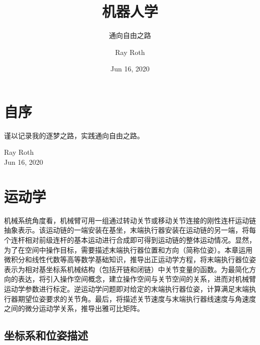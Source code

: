 \documentclass[cn,11pt,chinese,blue,bibstyle=ieeetr]{elegantbook}
\title{机器人学}
\subtitle{通向自由之路}
\author{Ray Roth}
\institute{Enabot}
\date{Jun 16, 2020}
\begin{document}
\maketitle
\frontmatter

\chapter*{自序}
谨以记录我的逐梦之路，实践通向自由之路。

\vskip 1.5cm

\begin{flushright}
Ray Roth\\
Jun 16, 2020
\end{flushright}

\tableofcontents

\mainmatter


\chapter{运动学}

机械系统角度看，机械臂可用一组通过转动关节或移动关节连接的刚性连杆运动链抽象表示。该运动链的一端安装在基坐，末端执行器安装在运动链的另一端，将每个连杆相对前级连杆的基本运动进行合成即可得到运动链的整体运动情况。显然，为了在空间中操作目标，需要描述末端执行器位置和方向（简称位姿）。本章运用微积分和线性代数等高等数学基础知识，推导出正运动学方程，将末端执行器位姿表示为相对基坐标系机械结构（包括开链和闭链）中关节变量的函数。为最简化方向的表达，将引入操作空间概念，建立操作空间与关节空间的关系，进而对机械臂运动学参数进行标定。逆运动学问题即对给定的末端执行器位姿，计算满足末端执行器期望位姿要求的关节角。最后，将描述关节速度与末端执行器线速度与角速度之间的微分运动学关系，推导出雅可比矩阵。

\begin{introduction}
	\item {}
	\item {}
	\item {}
	\item {}
	\item {}
\end{introduction}


\section{坐标系和位姿描述}\label{coordinate_system_and_pose_description}
\end{document}
